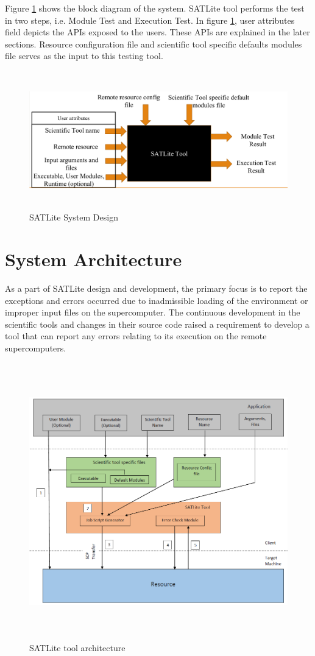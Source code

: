 \documentclass[10pt]{ruthesis}
\begin{document}
Figure \ref{fig:satdesign} shows the block diagram of the system. SATLite tool performs the test in two steps, i.e. Module Test and Execution Test. In figure \ref{fig:satdesign}, user attributes field depicts the APIs exposed to the users. These APIs are explained in the later sections. Resource configuration file and scientific tool specific defaults modules file serves as the input to this testing tool. 

\begin{figure}
  \centering
  \includegraphics[width=16cm,height=6cm]{satlite_design.png}
  \caption{SATLite System Design}
  \label{fig:satdesign}
\end{figure}

\section{System Architecture}
As a part of SATLite design and development, the primary focus is to report the exceptions and errors occurred due to inadmissible loading of the environment or improper input files on the supercomputer. The continuous development in the scientific tools and changes in their source code raised a requirement to develop a tool that can report any errors relating to its execution on the remote supercomputers.

\begin{figure}
  \centering
  \includegraphics[width=14cm,height=12cm]{satlite.png}
  \caption{SATLite tool architecture}
  \label{fig:satarch}
\end{figure}
\end{document}
